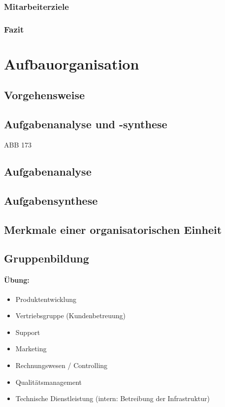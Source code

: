 \subsubsection{Mitarbeiterziele}
\subsubsection{Fazit}

\section{Aufbauorganisation}
\subsection{Vorgehensweise}
\subsection{Aufgabenanalyse und -synthese}
ABB 173
\subsection{Aufgabenanalyse}
\subsection{Aufgabensynthese}
\subsection{Merkmale einer organisatorischen Einheit}
\subsection{Gruppenbildung}
\paragraph{Übung:}
\begin{itemize}
\item Produktentwicklung
\item Vertriebsgruppe (Kundenbetreuung)
\item Support
\item Marketing
\item Rechnungswesen / Controlling
\item Qualitätsmanagement
\item Technische Dienstleistung (intern: Betreibung der Infrastruktur)
\end{itemize}
